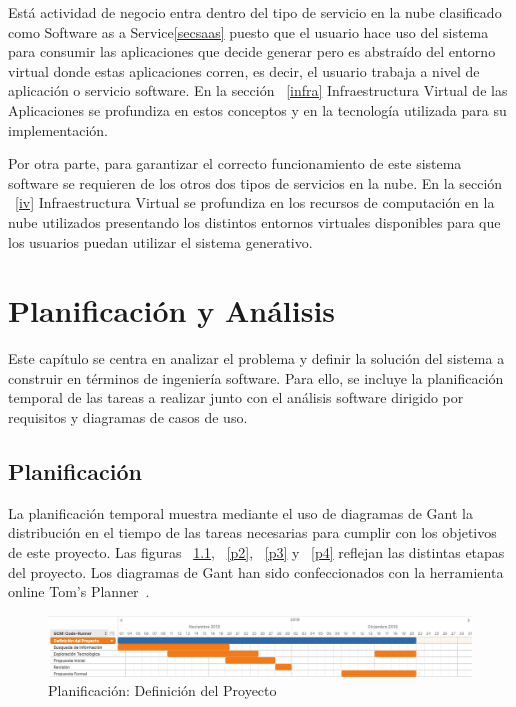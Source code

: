 \documentclass[a4paper,11pt]{book}
\begin{document}
Está actividad de negocio entra dentro del tipo de servicio en la nube clasificado como Software as a Service\ref{secsaas} puesto que el usuario hace uso del sistema para consumir las aplicaciones que decide generar pero es abstraído del entorno virtual donde estas aplicaciones corren, es decir, el usuario trabaja a nivel de aplicación o servicio software. En la sección ~\ref{infra}  Infraestructura Virtual de las Aplicaciones se profundiza en estos conceptos y en la tecnología utilizada para su implementación. 

Por otra parte, para garantizar el correcto funcionamiento de este sistema software se requieren de los otros dos tipos de servicios en la nube. En la sección ~\ref{iv} Infraestructura Virtual se profundiza en los recursos de computación en la nube utilizados presentando los distintos entornos virtuales disponibles para que los usuarios puedan utilizar el sistema generativo.


\chapter{Planificación y Análisis}

Este capítulo se centra en analizar el problema y definir la solución del sistema a construir en términos de ingeniería software. Para ello, se incluye la planificación temporal de las tareas a realizar junto con el análisis software dirigido por requisitos y diagramas de casos de uso.

\section{Planificación}

La planificación temporal muestra mediante el uso de diagramas de Gant la distribución en el tiempo de las tareas necesarias para cumplir con los objetivos de este proyecto. Las figuras ~\ref{p1}, ~\ref{p2}, ~\ref{p3} y ~\ref{p4} reflejan las distintas etapas del proyecto. Los diagramas de Gant han sido confeccionados con la herramienta online Tom's Planner~\cite{tom}.


\begin{figure}[H]
\centering
\includegraphics[scale=0.20]{imagenes/gant1.png}
\caption{ Planificación: Definición del Proyecto}
\label{p1}
\end{figure}
\end{document}
